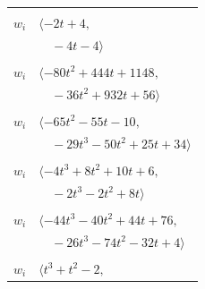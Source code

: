 \documentclass[11pt]{article}
\begin{document}
\begin{longtable}{@{}ll@{}}
\addlinespace[2pt]
\multicolumn{2}{@{}p{0.97\textwidth}@{}}{$i=11$, $D_i=1$, $\rho_{ij}$: $15{:}1, \allowbreak 17{:}2, \allowbreak 40{:}2, \allowbreak 41{:}2$}\\
$w_i$ & $\langle -2t+4,$\\
 & $\quad -4t-4\rangle$\\
\addlinespace[2pt]
\multicolumn{2}{@{}p{0.97\textwidth}@{}}{$i=12$, $D_i=1$, $\rho_{ij}$: $1{:}2, \allowbreak 8{:}2, \allowbreak 9{:}2, \allowbreak 10{:}2, \allowbreak 13{:}2, \allowbreak 14{:}2, \allowbreak 15{:}1, \allowbreak 19{:}2, \allowbreak 21{:}1, \allowbreak 26{:}2, \allowbreak 31{:}1, \allowbreak 35{:}2, \allowbreak 37{:}1, \allowbreak 38{:}1, \allowbreak 40{:}1$}\\
$w_i$ & $\langle -80t^{2}+444t+1148,$\\
 & $\quad -36t^{2}+932t+56\rangle$\\
\addlinespace[2pt]
\multicolumn{2}{@{}p{0.97\textwidth}@{}}{$i=13$, $D_i=1$, $\rho_{ij}$: $0{:}2, \allowbreak 9{:}2, \allowbreak 10{:}1, \allowbreak 12{:}1, \allowbreak 18{:}2, \allowbreak 20{:}2, \allowbreak 23{:}2, \allowbreak 24{:}2, \allowbreak 40{:}1, \allowbreak 42{:}1$}\\
$w_i$ & $\langle -65t^{2}-55t-10,$\\
 & $\quad -29t^{3}-50t^{2}+25t+34\rangle$\\
\addlinespace[2pt]
\multicolumn{2}{@{}p{0.97\textwidth}@{}}{$i=14$, $D_i=1$, $\rho_{ij}$: $4{:}2, \allowbreak 12{:}1, \allowbreak 18{:}2, \allowbreak 20{:}1, \allowbreak 25{:}1, \allowbreak 26{:}1, \allowbreak 31{:}2, \allowbreak 36{:}1, \allowbreak 38{:}2$}\\
$w_i$ & $\langle -4t^{3}+8t^{2}+10t+6,$\\
 & $\quad -2t^{3}-2t^{2}+8t\rangle$\\
\addlinespace[2pt]
\multicolumn{2}{@{}p{0.97\textwidth}@{}}{$i=15$, $D_i=1$, $\rho_{ij}$: $1{:}2, \allowbreak 6{:}1, \allowbreak 11{:}2, \allowbreak 12{:}2, \allowbreak 19{:}2, \allowbreak 20{:}2, \allowbreak 24{:}1, \allowbreak 25{:}1, \allowbreak 32{:}1, \allowbreak 39{:}1$}\\
$w_i$ & $\langle -44t^{3}-40t^{2}+44t+76,$\\
 & $\quad -26t^{3}-74t^{2}-32t+4\rangle$\\
\addlinespace[2pt]
\multicolumn{2}{@{}p{0.97\textwidth}@{}}{$i=16$, $D_i=1$, $\rho_{ij}$: $5{:}2, \allowbreak 7{:}1, \allowbreak 17{:}1, \allowbreak 24{:}1, \allowbreak 30{:}1$}\\
$w_i$ & $\langle t^{3}+t^{2}-2,$\\

\end{longtable}
\end{document}
